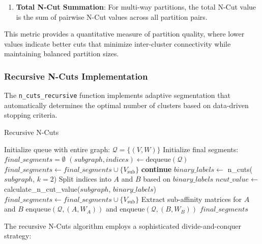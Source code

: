 \documentclass[12pt,a4paper]{article}
\begin{document}
{\begin{enumerate}
    \item \textbf{Total N-Cut Summation}: For multi-way partitions, the total N-Cut value is the sum of pairwise N-Cut values across all partition pairs.
\end{enumerate}

This metric provides a quantitative measure of partition quality, where lower values indicate better cuts that minimize inter-cluster connectivity while maintaining balanced partition sizes.

\subsubsection{Recursive N-Cuts Implementation}
\label{subsec:ncuts_recursive_impl}

The \texttt{n\_cuts\_recursive} function implements adaptive segmentation that automatically determines the optimal number of clusters based on data-driven stopping criteria.


\begin{algorithm}[H]
\caption{Recursive N-Cuts}
\begin{algorithmic}[1]
    \State Initialize queue with entire graph: $\mathcal{Q} = \{(V, W)\}$
    \State Initialize final segments: $final\_segments = \emptyset$ 
        \State $(subgraph, indices) \gets \text{dequeue}(\mathcal{Q})$
         
            \State  $final\_segments \leftarrow final\_segments \cup \{V_{\text{sub}}\}$
            \State \textbf{continue}
        \EndIf
        \State $binary\_labels \gets$ n\_cuts($subgraph$, $k=2$)
        \State Split indices into $A$ and $B$ based on $binary\_labels$
        \State $ncut\_value \gets$ calculate\_n\_cut\_value($subgraph$, $binary\_labels$)
         
            \State  $final\_segments \leftarrow final\_segments \cup \{V_{\text{sub}}\}$
        \Else
            \State Extract sub-affinity matrices for $A$ and $B$
            \State $\text{enqueue}(\mathcal{Q}, (A, W_A))$ and $\text{enqueue}(\mathcal{Q}, (B, W_B))$
        \EndIf
    \EndWhile
    \State \Return $final\_segments$
\EndFunction
\end{algorithmic}
\end{algorithm}

The recursive N-Cuts algorithm employs a sophisticated divide-and-conquer strategy:

}
\end{document}
